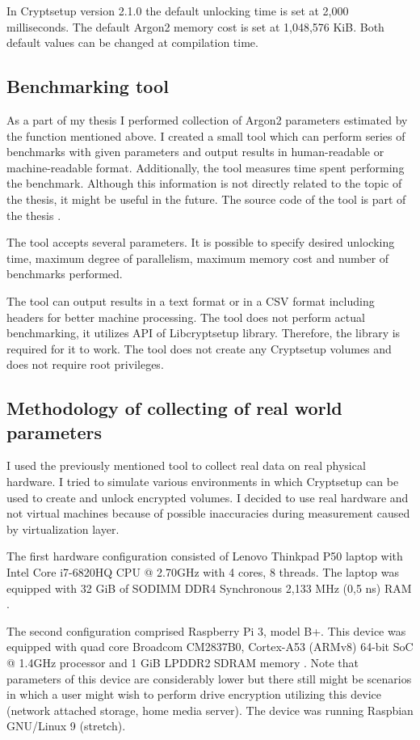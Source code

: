 \documentclass[nolof,digital]{fithesis3}
\begin{document}
In Cryptsetup version 2.1.0 the default unlocking time is set at 2,000 milliseconds. The default Argon2 memory cost is set at 1,048,576 KiB. Both default values can be changed at compilation time.

\subsection{Benchmarking tool}
As a part of my thesis I performed collection of Argon2 parameters estimated by the function mentioned above. I created a small tool which can perform series of benchmarks with given parameters and output results in human-readable or machine-readable format. Additionally, the tool measures time spent performing the benchmark. Although this information is not directly related to the topic of the thesis, it might be useful in the future. The source code of the tool is part of the thesis \parencite{thesisrepo}.

The tool accepts several parameters. It is possible to specify desired unlocking time, maximum degree of parallelism, maximum memory cost and number of benchmarks performed.

The tool can output results in a text format or in a CSV format including headers for better machine processing. The tool does not perform actual benchmarking, it utilizes API of Libcryptsetup library. Therefore, the library is required for it to work. The tool does not create any Cryptsetup volumes and does not require root privileges.

\subsection{Methodology of collecting of real world parameters}
\label{subsec:laptop}
I used the previously mentioned tool to collect real data on real physical hardware. I tried to simulate various environments in which Cryptsetup can be used to create and unlock encrypted volumes. I decided to use real hardware and not virtual machines because of possible inaccuracies during measurement caused by virtualization layer.

The first hardware configuration consisted of Lenovo Thinkpad P50 laptop with Intel Core i7-6820HQ CPU @ 2.70GHz with 4 cores, 8 threads. The laptop was equipped with 32 GiB of SODIMM DDR4 Synchronous 2,133 MHz (0,5 ns) RAM \parencite{laptopspecs}.

The second configuration comprised Raspberry Pi 3, model B+. This device was equipped with quad core Broadcom CM2837B0, Cortex-A53 (ARMv8) 64-bit SoC @ 1.4GHz processor and 1 GiB LPDDR2 SDRAM memory \parencite{raspberryspecs}. Note that parameters of this device are considerably lower but there still might be scenarios in which a user might wish to perform drive encryption utilizing this device (network attached storage, home media server). The device was running Raspbian GNU/Linux 9 (stretch).
\end{document}
